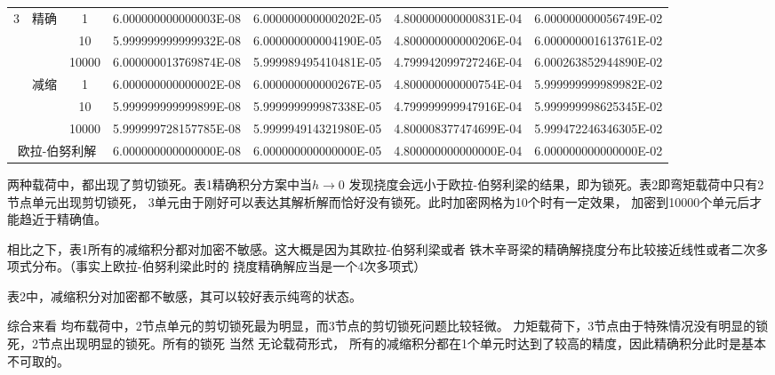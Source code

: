 \documentclass[UTF8,c5size]{ctexart}
\begin{document}
\begin{table*}[htbp]
\begin{center}
\begin{tabular}{|c|c|c|c|c|c|c|}
            \multirow{6}{*}{3}&\multirow{3}{*}{精确}&
            1&6.000000000000003E-08&6.000000000000202E-05&4.800000000000831E-04&6.000000000056749E-02\\
            \cline{3-7}
            &&
            10&5.999999999999932E-08&6.000000000004190E-05&4.800000000000206E-04&6.000000001613761E-02\\
            \cline{3-7}
            &&
            10000&6.000000013769874E-08&5.999989495410481E-05&4.799942099727246E-04&6.000263852944890E-02\\
            \cline{2-7}
            &\multirow{3}{*}{减缩}&
            1&6.000000000000002E-08&6.000000000000267E-05&4.800000000000754E-04&5.999999999989982E-02\\
            \cline{3-7}
            &&
            10&5.999999999999899E-08&5.999999999987338E-05&4.799999999947916E-04&5.999999998625345E-02\\
            \cline{3-7}
            &&
            10000&5.999999728157785E-08&5.999994914321980E-05&4.800008377474699E-04&5.999472246346305E-02\\
            \hline
    
            \multicolumn{3}{|c|}{欧拉-伯努利解}
            &6.000000000000000E-08&6.000000000000000E-05&4.800000000000000E-04&6.000000000000000E-02\\
            \hline
    
        \end{tabular}
    \end{center}
\end{table*}

两种载荷中，都出现了剪切锁死。表1精确积分方案中当$h\rightarrow0$
发现挠度会远小于欧拉-伯努利梁的结果，即为锁死。表2即弯矩载荷中只有2节点单元出现剪切锁死，
3单元由于刚好可以表达其解析解而恰好没有锁死。此时加密网格为10个时有一定效果，
加密到10000个单元后才能趋近于精确值。

相比之下，表1所有的减缩积分都对加密不敏感。这大概是因为其欧拉-伯努利梁或者
铁木辛哥梁的精确解挠度分布比较接近线性或者二次多项式分布。（事实上欧拉-伯努利梁此时的
挠度精确解应当是一个4次多项式）

表2中，减缩积分对加密都不敏感，其可以较好表示纯弯的状态。

综合来看
均布载荷中，2节点单元的剪切锁死最为明显，而3节点的剪切锁死问题比较轻微。
力矩载荷下，3节点由于特殊情况没有明显的锁死，2节点出现明显的锁死。所有的锁死
当然
无论载荷形式，
所有的减缩积分都在1个单元时达到了较高的精度，因此精确积分此时是基本不可取的。
\end{document}
